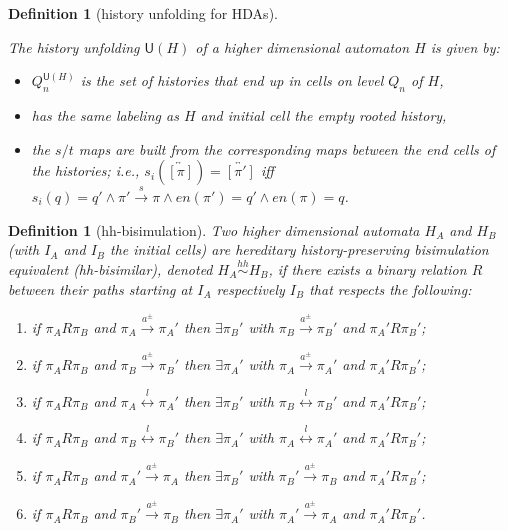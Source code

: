 \documentclass[submission,copyright,creativecommons]{eptcs}
\newtheorem{definition}[theorem]{Definition}
\newcommand\unfolding{\ensuremath{\mathsf{U}}}
\newcommand\finishPath[1]{\ensuremath{\mathit{en}(#1)}}
\newcommand\homotopyClass[1]{\ensuremath{\overleftrightarrow{[#1]}}}
\newcommand\hhequiv{\ensuremath{\stackrel{hh}{\sim}}}
\newcommand{\transition}[1]{\ensuremath{\xrightarrow{#1}}}
\newcommand{\homotopic}[1]{\ensuremath{\stackrel{#1}{\longleftrightarrow}}}
\begin{document}
\begin{definition}[history unfolding for HDAs]\label{def_unfolding_history}\ 

The \emph{history unfolding} $\unfolding(H)$ of a higher dimensional automaton $H$ is given by:
\begin{itemize}
\item $Q_{n}^{\unfolding(H)}$ is the set of histories that end up in cells on level $Q_n$ of $H$,
\item has the same labeling as $H$ and initial cell the empty rooted history,
\item the $s/t$ maps are built from the corresponding maps between the end cells of the histories; i.e., $s_{i}(\homotopyClass{\pi})=\homotopyClass{\pi'}$ iff $s_{i}(q)=q'\wedge \pi'\transition{s}\pi\wedge \finishPath{\pi'}=q'\wedge \finishPath{\pi}=q$.
\end{itemize}

\end{definition}


\begin{definition}[hh-bisimulation]\label{def_hhbisim}
Two higher dimensional automata $H_{A}$ and $H_{B}$ (with $I_{A}$ and $I_{B}$ the initial cells) are \emph{hereditary history-preserving bisimulation equivalent} (hh-bisimilar), denoted $H_{A} \hhequiv H_{B}$, if there exists a binary relation $R$ between their paths starting at $I_{A}$ respectively $I_{B}$ that respects the following:
\begin{enumerate}
\item if $\pi_{A}R\pi_{B}$ and $\pi_{A}\transition{a^{\pm}}\pi_{A}'$ then $\exists\pi_{B}'$ with $\pi_{B}\transition{a^{\pm}}\pi_{B}'$ and $\pi_{A}'R\pi_{B}'$;
\item if $\pi_{A}R\pi_{B}$ and $\pi_{B}\transition{a^{\pm}}\pi_{B}'$ then $\exists\pi_{A}'$ with $\pi_{A}\transition{a^{\pm}}\pi_{A}'$ and $\pi_{A}'R\pi_{B}'$;
\item\label{hh_HDM_l1} if $\pi_{A}R\pi_{B}$ and $\pi_{A}\homotopic{l}\pi_{A}'$ then $\exists\pi_{B}'$ with $\pi_{B}\homotopic{l}\pi_{B}'$ and $\pi_{A}'R\pi_{B}'$;
\item\label{hh_HDM_l2} if $\pi_{A}R\pi_{B}$ and $\pi_{B}\homotopic{l}\pi_{B}'$ then $\exists\pi_{A}'$ with $\pi_{A}\homotopic{l}\pi_{A}'$ and $\pi_{A}'R\pi_{B}'$;
\item if $\pi_{A}R\pi_{B}$ and $\pi_{A}'\transition{a^{\pm}}\pi_{A}$ then $\exists\pi_{B}'$ with $\pi_{B}'\transition{a^{\pm}}\pi_{B}$ and $\pi_{A}'R\pi_{B}'$;
\item if $\pi_{A}R\pi_{B}$ and $\pi_{B}'\transition{a^{\pm}}\pi_{B}$ then $\exists\pi_{A}'$ with $\pi_{A}'\transition{a^{\pm}}\pi_{A}$ and $\pi_{A}'R\pi_{B}'$.
\end{enumerate}
\end{definition}
\end{document}
